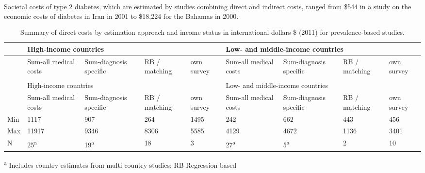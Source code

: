 Societal costs of type 2 diabetes, which are estimated by studies combining direct and indirect costs, ranged from \$544 in a study on the economic costs of diabetes in Iran \parencite{Esteghamati2009} in 2001 to \$18,224 for the Bahamas \parencite{Barcelo2003} in 2000. 

\begin{table}[p]
\begin{center}

\begin{threeparttable}
\begin{tabularx}{\linewidth}{X X X X X X X X X}
\caption{\label{tab:review_direct_costs_summary}Summary of direct costs by estimation approach and income status in international dollars \$ (2011) for prevalence-based studies.}\\
\toprule
& \multicolumn{4}{l}{High-income countries} & \multicolumn{4}{l}{Low- and middle-income countries} \\ \midrule
 & Sum-all medical costs & Sum-diagnosis specific & RB / matching & own survey & Sum-all medical costs & Sum-diagnosis specific & RB / matching & own survey \\ \midrule \endfirsthead
\caption[]{Summary of direct costs by estimation approach and income status in international dollars \$ (2011) for prevalence-based studies.}\\
 \toprule
 & \multicolumn{4}{l}{High-income countries} & \multicolumn{4}{l}{Low- and middle-income countries} \\ \midrule
  & Sum-all medical costs & Sum-diagnosis specific & RB / matching & own survey & Sum-all medical costs & Sum-diagnosis specific & RB / matching & own survey \\ \midrule \endhead
Min & 1117 & 907 & 264 & 1495 & 242 & 662 & 443 & 456 \\
Max & 11917 & 9346 & 8306 & 5585 & 4129 & 4672 & 1136 & 3401 \\
N & 25\textsuperscript{a} & 19\textsuperscript{a} & 18 & 3 & 27\textsuperscript{a} & 5\textsuperscript{a} & 2 & 10\\
 \bottomrule
\end{tabularx}
\begin{tablenotes}
\item \textsuperscript{a} Includes country estimates from multi-country studies; RB Regression based
\end{tablenotes}
\end{threeparttable}
\end{center}
\end{table}



